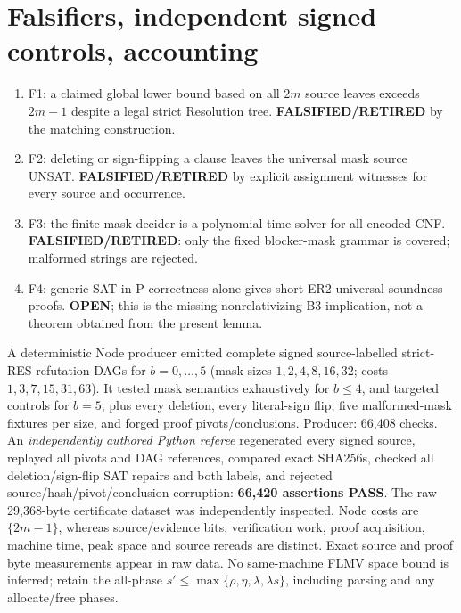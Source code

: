 \documentclass[11pt]{article}
\begin{document}
\section*{Falsifiers, independent signed controls, accounting}
\begin{enumerate}
 \item[] F1: a claimed global lower bound based on all $2m$ source leaves exceeds $2m-1$ despite a legal strict Resolution tree. \textbf{FALSIFIED/RETIRED} by the matching construction.
 \item[] F2: deleting or sign-flipping a clause leaves the universal mask source UNSAT. \textbf{FALSIFIED/RETIRED} by explicit assignment witnesses for every source and occurrence.
 \item[] F3: the finite mask decider is a polynomial-time solver for all encoded CNF. \textbf{FALSIFIED/RETIRED}: only the fixed blocker-mask grammar is covered; malformed strings are rejected.
 \item[] F4: generic SAT-in-P correctness alone gives short ER2 universal soundness proofs. \textbf{OPEN}; this is the missing nonrelativizing B3 implication, not a theorem obtained from the present lemma.
\end{enumerate}
A deterministic Node producer emitted complete signed source-labelled strict-RES refutation DAGs for $b=0,\ldots,5$ (mask sizes $1,2,4,8,16,32$; costs $1,3,7,15,31,63$). It tested mask semantics exhaustively for $b\le4$, and targeted controls for $b=5$, plus every deletion, every literal-sign flip, five malformed-mask fixtures per size, and forged proof pivots/conclusions. Producer: 66,408 checks. An \emph{independently authored Python referee} regenerated every signed source, replayed all pivots and DAG references, compared exact SHA256s, checked all deletion/sign-flip SAT repairs and both labels, and rejected source/hash/pivot/conclusion corruption: \textbf{66,420 assertions PASS}. The raw 29,368-byte certificate dataset was independently inspected. Node costs are $\{2m-1\}$, whereas source/evidence bits, verification work, proof acquisition, machine time, peak space and source rereads are distinct. Exact source and proof byte measurements appear in raw data. No same-machine FLMV space bound is inferred; retain the all-phase $s'\le\max\{\rho,\eta,\lambda,\lambda s\}$, including parsing and any allocate/free phases.
\end{document}
